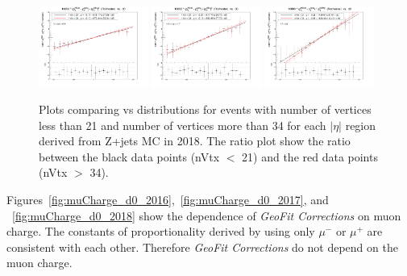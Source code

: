 \begin{figure}[h!]
    \centering
    \includegraphics[width=0.32\textwidth]{images_geofit/nVtx_eta_0_0p9_2018.png}
    \includegraphics[width=0.32\textwidth]{images_geofit/nVtx_eta_0p9_1p7_2018.png}
    \includegraphics[width=0.32\textwidth]{images_geofit/nVtx_eta_1p7_inf_2018.png}
    \caption{Plots comparing \dptoverptsquare vs \dzeroBS distributions for events with number of vertices less than 21 and number of vertices more than 34 for each $|\eta|$ region derived from Z+jets MC in 2018. The ratio plot show the ratio between the black data points (nVtx $<$ 21) and the red data points (nVtx $>$ 34).}
    \label{fig:nVtx_d0_2018}
\end{figure}

Figures~\ref{fig:muCharge_d0_2016},~\ref{fig:muCharge_d0_2017}, and ~\ref{fig:muCharge_d0_2018} show the dependence of \textit{GeoFit Corrections} on muon charge. The constants of proportionality derived by using only $\mu^-$ or $\mu^+$ are consistent with each other. Therefore \textit{GeoFit Corrections} do not depend on the muon charge.

